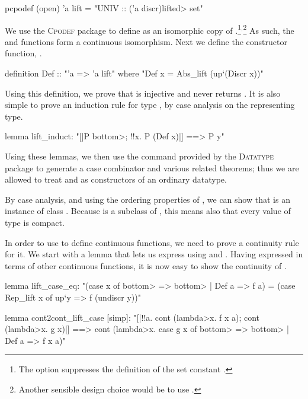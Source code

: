 \begin{isacode}
pcpodef (open) 'a lift = "UNIV :: ('a discr)\<lifted> set"
\end{isacode}

\noindent
We use the \textsc{Cpodef} package to define  as an isomorphic copy of .\footnote{The  option suppresses the definition of the set constant .}$^,$\footnote{Another sensible design choice would be to use .} As such, the  and  functions form a continuous isomorphism. Next we define the constructor function, .

\begin{isacode}
definition Def :: "'a => 'a lift"
  where "Def x = Abs_lift (up`(Discr x))"
\end{isacode}
%
Using this definition, we prove that  is injective and never returns . It is also simple to prove an induction rule for type , by case analysis on the representing type.

\begin{isacode}
lemma lift_induct: "[|P \<bottom>; !!x. P (Def x)|] ==> P y"
\end{isacode}

\noindent
Using these lemmas, we then use the  command provided by the \textsc{Datatype} package to generate a case combinator  and various related theorems; thus we are allowed to treat  and  as constructors of an ordinary datatype.

By case analysis, and using the ordering properties of , we can show that  is an instance of class . Because  is a subclass of , this means also that every value of type  is compact.

In order to use  to define continuous functions, we need to prove a continuity rule for it. We start with a lemma that lets us express  using  and . Having expressed  in terms of other continuous functions, it is now easy to show the continuity of .

\begin{isacode}
lemma lift_case_eq:
  "(case x of \<bottom> => \<bottom> | Def a => f a) = (case Rep_lift x of up`y => f (undiscr y))"
\end{isacode}
\unmedskip
{}
\begin{isacode}
lemma cont2cont_lift_case [simp]:
  "[|!!a. cont (\<lambda>x. f x a); cont (\<lambda>x. g x)|]
    ==> cont (\<lambda>x. case g x of \<bottom> => \<bottom> | Def a => f x a)"
\end{isacode}

